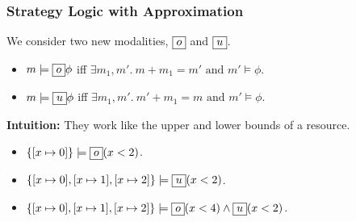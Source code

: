 \begin{frame}[fragile]
    \frametitle{Strategy Logic with Approximation}

\begin{definition} We consider two new modalities, $\boxed{o}$ and $\boxed{u}$.
    \begin{itemize}
        \item $m \models\boxed{o}\phi$ iff $\exists m_1, m'.\ m + m_1 = m' \text{ and } m' \models\phi$.
        \item $m \models\boxed{u}\phi$ iff $\exists m_1, m'.\ m' + m_1 = m  \text{ and } m' \models\phi$.
    \end{itemize}
\end{definition}

\textbf{Intuition:} They work like the upper and lower bounds of a resource.

\begin{example}
    \begin{itemize}
        \item $\{[x\mapsto 0]\} \models\boxed{o}(x < 2)$.
        \item $\{[x\mapsto 0], [x\mapsto 1], [x\mapsto 2]\} \models\boxed{u}(x < 2)$.
        \item $\{[x\mapsto 0], [x\mapsto 1], [x\mapsto 2]\} \models\boxed{o}(x < 4) \land \boxed{u}(x < 2)$.
    \end{itemize}
\end{example}

\end{frame}

